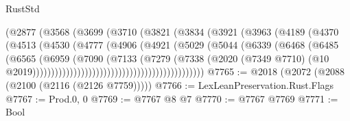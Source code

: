 \begin{lexlean}{RustStd}
\begin{coremodule}
                                        (@2877
                                          (@3568
                                            (@3699
                                              (@3710
                                                (@3821
                                                  (@3834
                                                    (@3921
                                                      (@3963
                                                        (@4189
                                                          (@4370
                                                            (@4513
                                                              (@4530
                                                                (@4777
                                                                  (@4906
                                                                    (@4921
                                                                      (@5029
                                                                        (@5044
                                                                          (@6339
                                                                            (@6468
                                                                              (@6485
                                                                                (@6565
                                                                                  (@6959
                                                                                    (@7090
                                                                                      (@7133
                                                                                        (@7279
                                                                                          (@7338
                                                                                            (@2020
                                                                                              (@7349
                                                                                                @7710)
                                                                                              (@10
                                                                                                @2019))))))))))))))))))))))))))))))))))))))))))))))
@7765 := @2018 (@2072 (@2088 (@2100 (@2116 (@2126 @7759)))))
@7766 := LexLeanPreservation.Rust.Flags
@7767 := Prod.{0, 0}
@7769 := @7767 @8 @7
@7770 := @7767 @7769
@7771 := Bool

\end{coremodule}
\end{lexlean}
